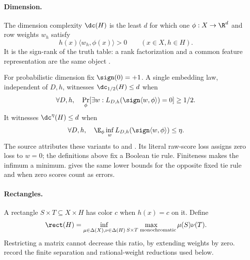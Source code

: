 \paragraph{Dimension.}
The dimension complexity $\dc(H)$ is the least $d$ for which one $\phi:X\to\R^d$ and row weights $w_h$ satisfy
\begin{equation}\label{eq:strict}
 h(x)\langle w_h,\phi(x)\rangle>0\qquad(x\in X,h\in H).
\end{equation}
It is the sign-rank of the truth table: a rank factorization and a common feature representation are the same object \citep{BDES02}.

For probabilistic dimension fix $\sign(0)=+1$. A single embedding law, independent of $D,h$, witnesses $\dc_{1/2}(H)\le d$ when
\[
 \forall D,h,\quad \Pr_\phi[\exists w:L_{D,h}(\sign\langle w,\phi\rangle)=0]\ge1/2.
\]
It witnesses $\dc^\eta(H)\le d$ when
\[
 \forall D,h,\quad \E_\phi\inf_w L_{D,h}(\sign\langle w,\phi\rangle)\le\eta.
\]
The source attributes these variants to \citet{CMW25} and \citet{KMS20}. Its literal raw-score loss assigns zero loss to $w=0$; the definitions above fix a Boolean tie rule. Finiteness makes the infimum a minimum.  gives the same lower bounds for the opposite fixed tie rule and when zero scores count as errors.

\paragraph{Rectangles.}
A rectangle $S\times T\subseteq X\times H$ has color $c$ when $h(x)=c$ on it. Define
\[
 \rect(H)=\inf_{\mu\in\Delta(X),\nu\in\Delta(H)}
 \max_{S\times T\text{ monochromatic}}\mu(S)\nu(T).
\]
Restricting a matrix cannot decrease this ratio, by extending weights by zero.  record the finite separation and rational-weight reductions used below.
